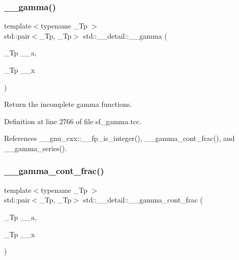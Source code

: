 \mbox{\label{namespacestd_1_1____detail_a00ade496acee116fb7990d20ff4be762}} 
\subsubsection{\texorpdfstring{\+\_\+\+\_\+gamma()}{\_\_gamma()}\hspace{0.1cm}{\footnotesize\ttfamily [2/2]}}
{\footnotesize\ttfamily template$<$typename \+\_\+\+Tp $>$ \\
std\+::pair$<$\+\_\+\+Tp, \+\_\+\+Tp$>$ std\+::\+\_\+\+\_\+detail\+::\+\_\+\+\_\+gamma (\begin{DoxyParamCaption}\item[{\+\_\+\+Tp}]{\+\_\+\+\_\+a,  }\item[{\+\_\+\+Tp}]{\+\_\+\+\_\+x }\end{DoxyParamCaption})}



Return the incomplete gamma functions. 



Definition at line 2766 of file sf\+\_\+gamma.\+tcc.



References \+\_\+\+\_\+gnu\+\_\+cxx\+::\+\_\+\+\_\+fp\+\_\+is\+\_\+integer(), \+\_\+\+\_\+gamma\+\_\+cont\+\_\+frac(), and \+\_\+\+\_\+gamma\+\_\+series().

\mbox{\label{namespacestd_1_1____detail_afd6319747af991947a02388acee40c26}} 
\subsubsection{\texorpdfstring{\+\_\+\+\_\+gamma\+\_\+cont\+\_\+frac()}{\_\_gamma\_cont\_frac()}}
{\footnotesize\ttfamily template$<$typename \+\_\+\+Tp $>$ \\
std\+::pair$<$\+\_\+\+Tp, \+\_\+\+Tp$>$ std\+::\+\_\+\+\_\+detail\+::\+\_\+\+\_\+gamma\+\_\+cont\+\_\+frac (\begin{DoxyParamCaption}\item[{\+\_\+\+Tp}]{\+\_\+\+\_\+a,  }\item[{\+\_\+\+Tp}]{\+\_\+\+\_\+x }\end{DoxyParamCaption})}



